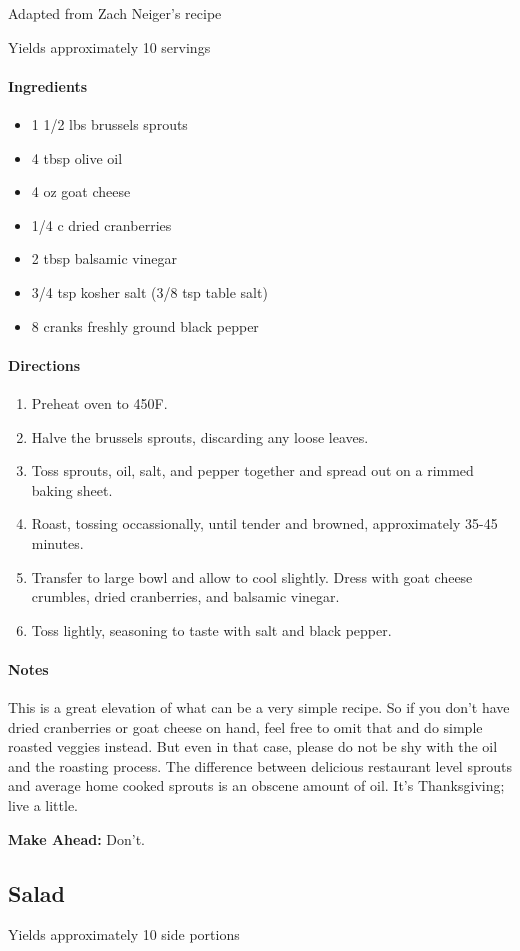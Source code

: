 \documentclass[12pt]{article}
\newenvironment*{ingredients}
	{
		\paragraph*{Ingredients}
		\begin{itemize}
	}
	{
		\end{itemize}
	}
\newenvironment*{directions}
	{
		\paragraph*{Directions}
		\begin{enumerate}
	}
	{
		\end{enumerate}
	}
\newenvironment*{notes}
	{
		\paragraph*{Notes}
		\begin{adjustwidth}{1cm}{}
	}
	{
		\end{adjustwidth}
	}
\begin{document}
	Adapted from Zach Neiger's recipe
	
	Yields approximately 10 servings
	
	\begin{ingredients}
		\item 1 1/2 lbs brussels sprouts
		\item 4 tbsp olive oil
		\item 4 oz goat cheese
		\item 1/4 c dried cranberries
		\item 2 tbsp balsamic vinegar
		\item 3/4 tsp kosher salt (3/8 tsp table salt)
		\item 8 cranks freshly ground black pepper
	\end{ingredients}
	
	\begin{directions}
		\item Preheat oven to 450F.
		\item Halve the brussels sprouts, discarding any loose leaves.
		\item Toss sprouts, oil, salt, and pepper together and spread out on a rimmed baking sheet.
		\item Roast, tossing occassionally, until tender and browned, approximately 35-45 minutes.
		\item Transfer to large bowl and allow to cool slightly. Dress with goat cheese crumbles, dried cranberries, and balsamic vinegar.
		\item Toss lightly, seasoning to taste with salt and black pepper.
	\end{directions}
	
	\begin{notes}
		This is a great elevation of what can be a very simple recipe. So if you don't have dried cranberries or goat cheese on hand, feel free to omit that and do simple roasted veggies instead. But even in that case, please do not be shy with the oil and the roasting process. The difference between delicious restaurant level sprouts and average home cooked sprouts is an obscene amount of oil. It's Thanksgiving; live a little.
		
		\textbf{Make Ahead:} Don't.
	\end{notes}
	
	\newpage
	
	\subsection{Salad}\label{sec:salad}
	Yields approximately 10 side portions
	
\end{document}
